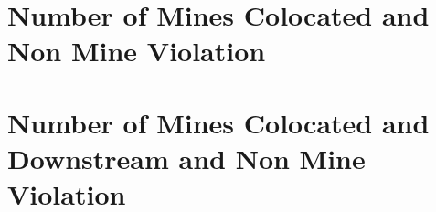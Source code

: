 \documentclass{beamer}
\begin{document}
\begin{frame}{}

\end{frame}

\begin{frame}{}

\end{frame}

\begin{frame}{}

\end{frame}

\begin{frame}{}

\end{frame}

\section{Number of Mines Colocated and Non Mine Violation}

\begin{frame}{}

\end{frame}

\begin{frame}{}

\end{frame}

\begin{frame}{}

\end{frame}

\begin{frame}{}

\end{frame}

\begin{frame}{}


\end{frame}
\section{Number of Mines Colocated and Downstream and Non Mine Violation}

\begin{frame}{}

\end{frame}
\end{document}
